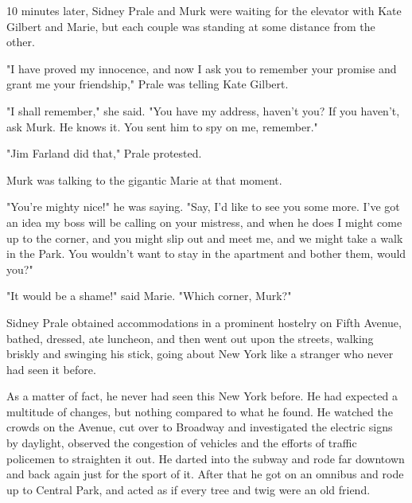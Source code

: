 \documentclass{novel}
\begin{document}
\*\*\*

10 minutes later, Sidney Prale and Murk were waiting for the elevator with Kate Gilbert and Marie, but each couple was standing at some distance from the other.

"I have proved my innocence, and now I ask you to remember your promise and grant me your friendship," Prale was telling Kate Gilbert.

"I shall remember," she said. "You have my address, haven't you? If you haven't, ask Murk. He knows it. You sent him to spy on me, remember."

"Jim Farland did that," Prale protested.

Murk was talking to the gigantic Marie at that moment.

"You're mighty nice!" he was saying. "Say, I'd like to see you some more. I've got an idea my boss will be calling on your mistress, and when he does I might come up to the corner, and you might slip out and meet me, and we might take a walk in the Park. You wouldn't want to stay in the apartment and bother them, would you?"

"It would be a shame!" said Marie. "Which corner, Murk?"

\vspace{2\nbs}
\clearpage
\thispagestyle{empty}

\begin{ChapterStart}
\vspace{3\nbs}
\end{ChapterStart}
    
Sidney Prale obtained accommodations in a prominent hostelry on Fifth Avenue, bathed, dressed, ate luncheon, and then went out upon the streets, walking briskly and swinging his stick, going about New York like a stranger who never had seen it before.

As a matter of fact, he never had seen this New York before. He had expected a multitude of changes, but nothing compared to what he found. He watched the crowds on the Avenue, cut over to Broadway and investigated the electric signs by daylight, observed the congestion of vehicles and the efforts of traffic policemen to straighten it out. He darted into the subway and rode far downtown and back again just for the sport of it. After that he got on an omnibus and rode up to Central Park, and acted as if every tree and twig were an old friend.
\end{document}
